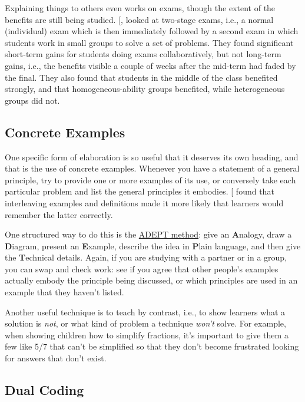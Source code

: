 Explaining things to others even works on exams, though the extent of
the benefits are still being
studied. {[},\protect[\hyperlink{b:Cao2017b}{Cao2017b}]{]} looked at two-stage
exams, i.e., a normal (individual) exam which is then immediately
followed by a second exam in which students work in small groups to
solve a set of problems. They found significant short-term gains for
students doing exams collaboratively, but not long-term gains, i.e.,
the benefits visible a couple of weeks after the mid-term had faded by
the final. They also found that students in the middle of the class
benefited strongly, and that homogeneous-ability groups benefited,
while heterogeneous groups did not.

\subsection{Concrete Examples}\label{concrete-examples}

One specific form of elaboration is so useful that it deserves its own
heading, and that is the use of concrete examples. Whenever you have a
statement of a general principle, try to provide one or more examples of
its use, or conversely take each particular problem and list the general
principles it embodies. {[}\protect[\hyperlink{b:Raws2014}{Raws2014}]{]} found that interleaving
examples and definitions made it more likely that learners would
remember the latter correctly.

One structured way to do this is the \href{https://betterexplained.com/articles/adept-method/}{ADEPT method}: give an
\textbf{A}nalogy, draw a \textbf{D}iagram, present an \textbf{E}xample, describe the
idea in \textbf{P}lain language, and then give the \textbf{T}echnical details.
Again, if you are studying with a partner or in a group, you can swap
and check work: see if you agree that other people's examples actually
embody the principle being discussed, or which principles are used in
an example that they haven't listed.

Another useful technique is to teach by contrast, i.e., to show learners
what a solution is \emph{not}, or what kind of problem a technique \emph{won't}
solve. For example, when showing children how to simplify fractions,
it's important to give them a few like 5/7 that can't be simplified so
that they don't become frustrated looking for answers that don't exist.

\subsection{Dual Coding}\label{dual-coding}

